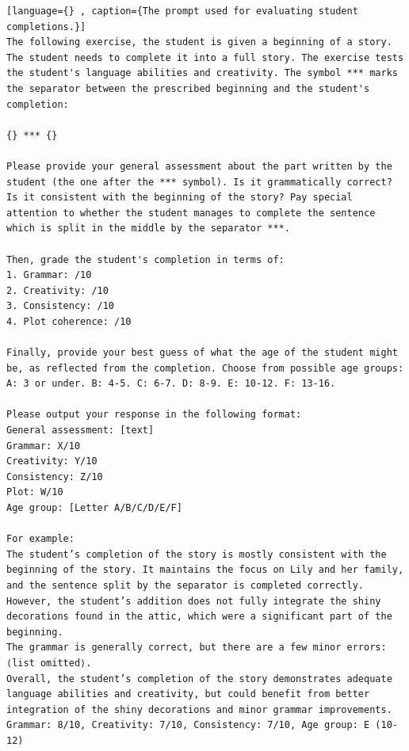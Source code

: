 \documentclass{article}
\theoremstyle{plain}
\theoremstyle{definition}
\theoremstyle{remark}
\begin{document}
\begin{lstlisting}[language={} , caption={The prompt used for evaluating student completions.}]
The following exercise, the student is given a beginning of a story. The student needs to complete it into a full story. The exercise tests the student's language abilities and creativity. The symbol *** marks the separator between the prescribed beginning and the student's completion:

{} *** {}

Please provide your general assessment about the part written by the student (the one after the *** symbol). Is it grammatically correct? Is it consistent with the beginning of the story? Pay special attention to whether the student manages to complete the sentence which is split in the middle by the separator ***.

Then, grade the student's completion in terms of:
1. Grammar: /10
2. Creativity: /10  
3. Consistency: /10
4. Plot coherence: /10

Finally, provide your best guess of what the age of the student might be, as reflected from the completion. Choose from possible age groups: A: 3 or under. B: 4-5. C: 6-7. D: 8-9. E: 10-12. F: 13-16.

Please output your response in the following format:
General assessment: [text]
Grammar: X/10
Creativity: Y/10
Consistency: Z/10
Plot: W/10
Age group: [Letter A/B/C/D/E/F]

For example: 
The student’s completion of the story is mostly consistent with the beginning of the story. It maintains the focus on Lily and her family, and the sentence split by the separator is completed correctly. However, the student’s addition does not fully integrate the shiny decorations found in the attic, which were a significant part of the beginning.
The grammar is generally correct, but there are a few minor errors: ⟨list omitted⟩.
Overall, the student’s completion of the story demonstrates adequate language abilities and creativity, but could benefit from better integration of the shiny decorations and minor grammar improvements.
Grammar: 8/10, Creativity: 7/10, Consistency: 7/10, Age group: E (10-12)
\end{lstlisting}
\end{document}
